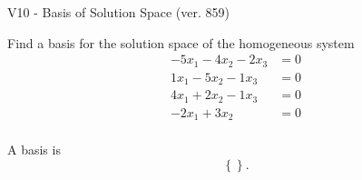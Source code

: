 \begin{exercise}
  \begin{exerciseTitle}V10 - Basis of Solution Space (ver. 859)\end{exerciseTitle}
  \begin{exerciseStatement}
    Find a basis for the solution space of the homogeneous system 
\begin{align*}
 -5 x_ 1 -4 x_ 2 -2 x_ 3 &= 0  \\ 
  1 x_ 1 -5 x_ 2 -1 x_ 3 &= 0  \\ 
  4 x_ 1 + 2 x_ 2 -1 x_ 3 &= 0  \\ 
  -2 x_ 1 + 3 x_ 2 &= 0  \\ 
 \end{align*}


 
  \end{exerciseStatement}

  \begin{exerciseAnswer}
   A basis is   
\[\left\{\right\}.\]

  


  \end{exerciseAnswer}
\end{exercise}